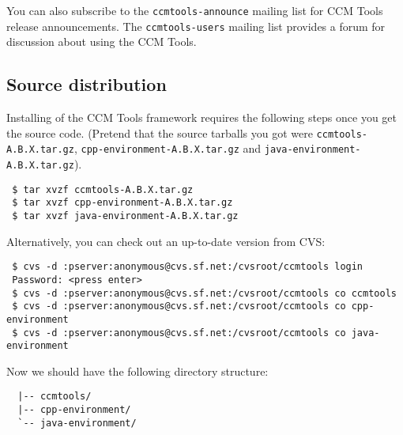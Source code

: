 You can also subscribe to the {\tt ccmtools-announce} mailing list for CCM Tools
release announcements. The {\tt ccmtools-users} mailing list provides a forum
for discussion about using the CCM Tools.



\subsection{Source distribution}
Installing of the CCM Tools framework requires the following steps once you get 
the source code. 
(Pretend that the source tarballs you got were {\tt ccmtools-A.B.X.tar.gz},
{\tt cpp-environment-A.B.X.tar.gz} and {\tt java-environment-A.B.X.tar.gz}).

\begin{small}
\begin{verbatim}
 $ tar xvzf ccmtools-A.B.X.tar.gz
 $ tar xvzf cpp-environment-A.B.X.tar.gz
 $ tar xvzf java-environment-A.B.X.tar.gz
\end{verbatim}
\end{small}

Alternatively, you can check out an up-to-date version from CVS:
\begin{small}
\begin{verbatim}
 $ cvs -d :pserver:anonymous@cvs.sf.net:/cvsroot/ccmtools login
 Password: <press enter>
 $ cvs -d :pserver:anonymous@cvs.sf.net:/cvsroot/ccmtools co ccmtools
 $ cvs -d :pserver:anonymous@cvs.sf.net:/cvsroot/ccmtools co cpp-environment
 $ cvs -d :pserver:anonymous@cvs.sf.net:/cvsroot/ccmtools co java-environment
\end{verbatim}
\end{small}

Now we should have the following directory structure: 
\begin{small}
\begin{verbatim}
  |-- ccmtools/
  |-- cpp-environment/
  `-- java-environment/
\end{verbatim}
\end{small}


